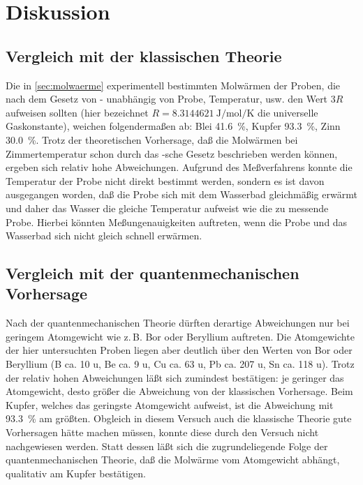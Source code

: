 
\section{Diskussion}

\subsection{Vergleich mit der klassischen Theorie}

Die in \cref{sec:molwaerme} experimentell bestimmten Molwärmen der
Proben, die nach dem Gesetz von - unabhängig
von Probe, Temperatur, usw. den Wert $3R$ aufweisen sollten (hier
bezeichnet $R = \SI{8.3144621}{\J\per\mol\per\kelvin}$ die universelle
Gaskonstante), weichen folgendermaßen ab: Blei \SI{41.6}{\percent},
Kupfer \SI{93.3}{\percent}, Zinn \SI{30.0}{\percent}.  Trotz der
theoretischen Vorhersage, daß die Molwärmen bei Zimmertemperatur schon
durch das -sche Gesetz beschrieben werden
können, ergeben sich relativ hohe Abweichungen.  Aufgrund des
Meßverfahrens konnte die Temperatur der Probe nicht direkt bestimmt
werden, sondern es ist davon ausgegangen worden, daß die Probe sich mit
dem Wasserbad gleichmäßig erwärmt und daher das Wasser die gleiche
Temperatur aufweist wie die zu messende Probe.  Hierbei könnten
Meßungenauigkeiten auftreten, wenn die Probe und das Wasserbad sich
nicht gleich schnell erwärmen.

\subsection{Vergleich mit der quantenmechanischen Vorhersage}

Nach der quantenmechanischen Theorie dürften derartige Abweichungen nur
bei geringem Atomgewicht wie z.\,B. Bor oder Beryllium auftreten.  Die
Atomgewichte der hier untersuchten Proben liegen aber deutlich über den
Werten von Bor oder Beryllium (B ca. 10 u, Be ca. 9 u, Cu ca. 63 u, Pb
ca. 207 u, Sn ca. 118 u).  Trotz der relativ hohen Abweichungen läßt
sich zumindest bestätigen: je geringer das Atomgewicht, desto größer die
Abweichung von der klassischen Vorhersage.  Beim Kupfer, welches das
geringste Atomgewicht aufweist, ist die Abweichung mit
\SI{93.3}{\percent} am größten.  Obgleich in diesem Versuch auch die
klassische Theorie gute Vorhersagen hätte machen müssen, konnte diese
durch den Versuch nicht nachgewiesen werden.  Statt dessen läßt sich die
zugrundeliegende Folge der quantenmechanischen Theorie, daß die Molwärme
vom Atomgewicht abhängt, qualitativ am Kupfer bestätigen.
